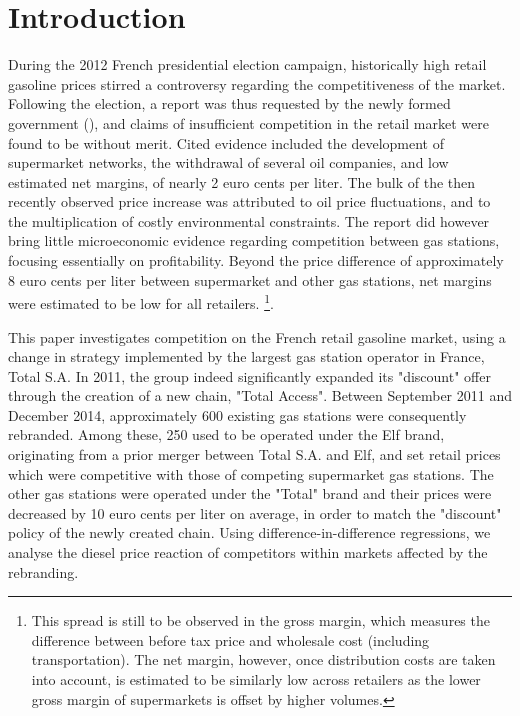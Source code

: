 \documentclass[english]{article}
\begin{document}
\newpage{}


\section{Introduction}

During the 2012 French presidential election campaign, historically high retail gasoline prices stirred a controversy regarding the competitiveness of the market. Following the election, a report was thus requested by the newly formed government (\cite{BEL12}), and claims of insufficient competition in the retail market were found to be without merit. Cited evidence included the development of supermarket networks, the withdrawal of several oil companies, and low estimated net margins, of nearly 2 euro cents per liter. The bulk of the then recently observed price increase was attributed to oil price fluctuations, and to the multiplication of costly environmental constraints. The report did however bring little microeconomic evidence regarding competition between gas stations, focusing essentially on profitability. Beyond the price difference of approximately 8 euro cents per liter between supermarket and other gas stations, net margins were estimated to be low for all retailers.%
\footnote{This spread is still to be observed in the gross margin, which measures the difference between before tax price and wholesale cost (including transportation). The net margin, however, once distribution costs are taken into account, is estimated to be similarly low across retailers as the lower gross margin of supermarkets is offset by higher volumes.}.

This paper investigates competition on the French retail gasoline market, using a change in strategy implemented by the largest gas station operator in France, Total S.A. In 2011, the group indeed significantly expanded its "discount" offer through the creation of a new chain, "Total Access". Between September 2011 and December 2014, approximately 600 existing gas stations were consequently rebranded. Among these, 250 used to be operated under the Elf brand, originating from a prior merger between Total S.A. and Elf, and set retail prices which were competitive with those of competing supermarket gas stations. The other gas stations were operated under the "Total" brand and their prices were decreased by 10 euro cents per liter on average, in order to match the "discount" policy of the newly created chain. Using difference-in-difference regressions, we analyse the diesel price reaction of competitors within markets affected by the rebranding.
\end{document}
